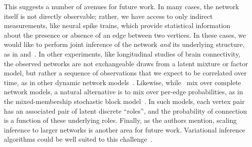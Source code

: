 This suggests a number of avenues for future work.  In many cases, the
network itself is not directly observable; rather, we have
access to only indirect measurements, like neural spike trains, which
provide statistical information about the presence or absence of an
edge between two vertices.  In these cases, we would like to
perform joint inference of the network \emph{and} its underlying
structure, as in \citet{linderman2014discovering}
and~\citet{linderman2016bayesian}.  In other experiments, like
longitudinal studies of brain connectivity, the observed networks are
not exchangeable draws from a latent mixture or factor model, but
rather a sequence of observations that we expect to be correlated over
time, as in other dynamic network
models~\citep[e.g.][]{bassett2011dynamic, linderman2014framework}.
Likewise, while~\citet{durante2016nonparametric} mix
over complete network models, a natural alternative is to mix over
per-edge probabilities, as in the mixed-membership stochastic block
model~\citep{airoldi2008mixed}. In such models, each vertex pair
has an associated pair of latent discrete ``roles'', and the probability
of connection is a function of these underlying roles.  
Finally, as the authors mention, scaling inference to larger networks
is another area for future work. Variational inference
algorithms could be well suited to this challenge~\citep{jordan1999introduction, blei2017variational}. 












































